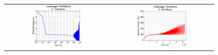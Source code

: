 \documentclass{listhesis}
\begin{document}
\clearpage
\newcommand\wsss{0.5}
\begin{figure}[!h]
\centering
\begin{tabular}{@{}cc@{}}
\includegraphics[width=\wsss\textwidth]{./include/figure_5.0/old/CovFacet0.eps}&
\includegraphics[width=\wsss\textwidth]{./include/figure_5.0/old/CovFacetError0.eps}\\

\end{tabular}
\end{figure}
\end{document}
